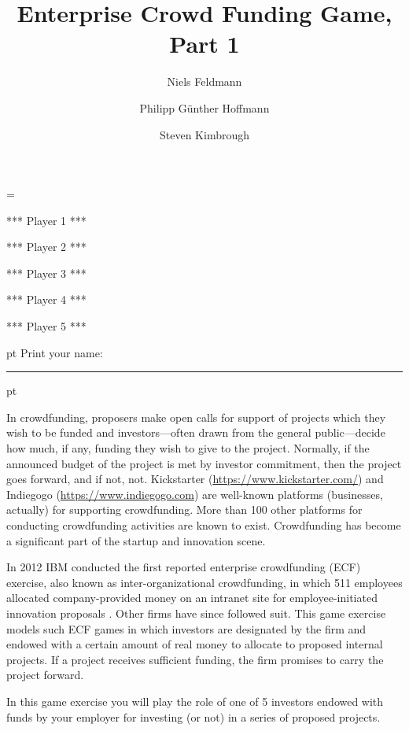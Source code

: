 \documentclass[11pt, oneside]{article}   	%
\title{Enterprise Crowd Funding Game, Part 1}
\author{Niels Feldmann \and Philipp G\"unther Hoffmann \and Steven Kimbrough}
\begin{document}
\maketitle
\newcount\playernum
{}
\setcounter{player}{1}
\playernum = \theplayer

\ifnum{}
\centerline{*** Player 1 ***}
\fi
\ifnum{}
\centerline{*** Player 2 ***}
\fi
\ifnum{}
\centerline{*** Player 3 ***}
\fi
\ifnum{}
\centerline{*** Player 4 ***}
\fi
\ifnum{}
\centerline{*** Player 5 ***}
\fi
{} pt
\noindent Print your name: \rule{11cm}{2pt}
 pt

In crowdfunding, proposers make open calls for support of  projects which they wish to be funded and investors---often drawn from the general public---decide how much, if any, funding they wish to give to the project. Normally, if the announced budget of the project is met by investor commitment, then the project goes forward, and if not, not. Kickstarter (\url{https://www.kickstarter.com/}) and Indiegogo (\url{https://www.indiegogo.com}) are well-known platforms (businesses, actually) for supporting crowdfunding. More than 100 other platforms for conducting crowdfunding activities are known to exist. Crowdfunding has become a significant part of the startup and innovation scene.

In 2012 IBM conducted the first reported enterprise crowdfunding (ECF) exercise, also known as inter-organizational crowdfunding, in which 511 employees allocated company-provided money on an intranet site for employee-initiated innovation proposals \citep{muller_etal_2013}. Other firms have since followed suit. This game exercise models such ECF games in which investors are designated by the firm and endowed with a certain amount of real money to allocate to proposed internal projects. If a project receives sufficient funding, the firm promises to carry the project forward.

In this game exercise you will play the role of one of 5 investors endowed with funds by your employer for investing (or not) in a series of proposed projects.
\end{document}
